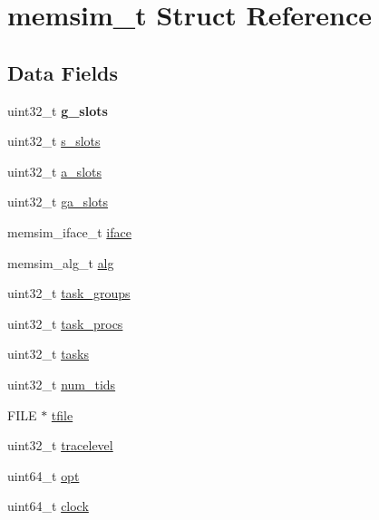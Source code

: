\hypertarget{structmemsim__t}{\section{memsim\-\_\-t Struct Reference}
\label{structmemsim__t}
}
\subsection*{Data Fields}
\begin{DoxyCompactItemize}
\item 
\hypertarget{structmemsim__t_a31602ed79156df735349134ab61d1c2a}{uint32\-\_\-t {\bfseries g\-\_\-slots}}\label{structmemsim__t_a31602ed79156df735349134ab61d1c2a}

\item 
uint32\-\_\-t \hyperlink{structmemsim__t_a35adeb1c88dde11bfe128119c723c037}{s\-\_\-slots}
\item 
uint32\-\_\-t \hyperlink{structmemsim__t_a855dbf0b36cad4e37ccb8dcb26caa864}{a\-\_\-slots}
\item 
uint32\-\_\-t \hyperlink{structmemsim__t_af10e3ad73189bf418d29478bb4de5eb2}{ga\-\_\-slots}
\item 
memsim\-\_\-iface\-\_\-t \hyperlink{structmemsim__t_a37831c21b74789b55a12495be077d120}{iface}
\item 
memsim\-\_\-alg\-\_\-t \hyperlink{structmemsim__t_ae9ec2da913a82a570dae07d3ae8d09b3}{alg}
\item 
uint32\-\_\-t \hyperlink{structmemsim__t_ac893c94cb9e4cb525baa4a4352ef6269}{task\-\_\-groups}
\item 
uint32\-\_\-t \hyperlink{structmemsim__t_a13c682d9789b022f02fbeafcdc2a0866}{task\-\_\-procs}
\item 
uint32\-\_\-t \hyperlink{structmemsim__t_a907d500eb21a9b3c8813ed0e639d806c}{tasks}
\item 
uint32\-\_\-t \hyperlink{structmemsim__t_a321563b1d52ef49a39ee5ef3266f21ab}{num\-\_\-tids}
\item 
F\-I\-L\-E $\ast$ \hyperlink{structmemsim__t_a0bdb5e96cb3acca8a4ec5daea271243d}{tfile}
\item 
uint32\-\_\-t \hyperlink{structmemsim__t_a5adec994c4699e314a35284102cb1cb3}{tracelevel}
\item 
uint64\-\_\-t \hyperlink{structmemsim__t_a34e92877e65240907a70bbfe16fd4a34}{opt}
\item 
uint64\-\_\-t \hyperlink{structmemsim__t_a09a7513daf69ea79d15c89b11efe5431}{clock}
\item 

\end{DoxyCompactItemize}
